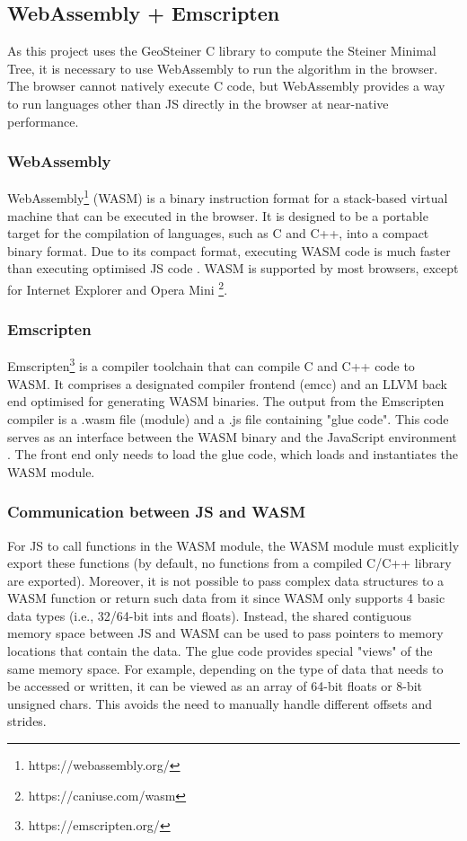 \documentclass{l4proj}
\begin{document}
\subsection{WebAssembly + Emscripten}
As this project uses the GeoSteiner C library to compute the Steiner Minimal Tree, it is necessary to use WebAssembly to run the algorithm in the browser. The browser cannot natively execute C code, but WebAssembly provides a way to run languages other than JS directly in the browser at near-native performance.
\subsubsection{WebAssembly}
WebAssembly\footnote{https://webassembly.org/} (WASM) is a binary instruction format for a stack-based virtual machine that can be executed in the browser. It is designed to be a portable target for the compilation of languages, such as C and C++, into a compact binary format.
Due to its compact format, executing WASM code is much faster than executing optimised JS code \citep{WebAssemblyIntro}.
WASM is supported by most browsers, except for Internet Explorer and Opera Mini \footnote{https://caniuse.com/wasm}.

\subsubsection{Emscripten}
\label{sec:emscripten}
Emscripten\footnote{https://emscripten.org/} is a compiler toolchain that can compile C and C++ code to WASM. It comprises a designated compiler frontend (emcc) and an LLVM back end optimised for generating WASM binaries.
The output from the Emscripten compiler is a .wasm file (module) and a .js file containing "glue code". This code serves as an interface between the WASM binary and the JavaScript environment \citep{Emscripten_tutorial}. The front end only needs to load the glue code, which loads and instantiates the WASM module.

\subsubsection{Communication between JS and WASM}
\label{sec:js_wasm_communication}
For JS to call functions in the WASM module, the WASM module must explicitly export these functions (by default, no functions from a compiled C/C++ library are exported).
Moreover, it is not possible to pass complex data structures to a WASM function or return such data from it since WASM only supports 4 basic data types (i.e., 32/64-bit ints and floats).
Instead, the shared contiguous memory space between JS and WASM can be used to pass pointers to memory locations that contain the data.
The glue code provides special "views" of the same memory space. For example, depending on the type of data that needs to be accessed or written, it can be viewed as an array of 64-bit floats or 8-bit unsigned chars.
This avoids the need to manually handle different offsets and strides.
\end{document}
